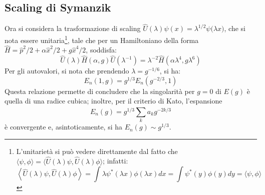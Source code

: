 \documentclass[10pt, a4paper]{scrartcl} %
\numberwithin{equation}{section}
\theoremstyle{style2}
\theoremstyle{style1}
\begin{document}
\subsection{Scaling di Symanzik}
Ora si considera la trasformazione di scaling $\hat{U}(\lambda ) \psi (x) = \lambda ^{1 / 2} \psi \big(\lambda x\big)$, che si nota essere unitaria\footnote{L'unitariet\`a si pu\`o vedere direttamente dal fatto che $\langle \psi ,\phi  \rangle= \langle \hat{U}(\lambda )\psi ,\hat{U}(\lambda ) \phi  \rangle$; infatti: 
\[
 \left\langle  \hat{U}(\lambda )\psi ,\hat{U}(\lambda ) \phi   \right\rangle =  \int \lambda \psi^* (\lambda x) \phi (\lambda x)  dx= \int \psi ^*(y) \phi (y) dy = \langle \psi ,\phi  \rangle
\] 
}, tale che per un Hamiltoniano della forma $\hat{H}= \hat{p}^2 / 2 + \alpha  \hat{x}^2 / 2 + g \hat{x}^4 / 2$, soddisfa:
\begin{equation}
	\hat{U}(\lambda ) \hat{H}(\alpha ,g) \hat{U}(\lambda ^{-1} ) = \lambda ^{-2}  \hat{H}(\alpha \lambda ^4, g \lambda ^6)
\end{equation}
Per gli autovalori, si nota che prendendo $\lambda = g ^{ -1/6} $, si ha:
\begin{equation}\label{wer}
	E_n(1,g) = g^{1 / 3} E_n(g^{-2 / 3} , 1)
\end{equation}
Questa relazione permette di concludere che la singolarit\`a per $g = 0$ di $E(g)$ \`e quella di una radice cubica; inoltre, per il criterio di Kato, l'espansione
\[
E_n(g) = g^{1 / 3} \sum_{k}^{} a_k g^{ - 2k / 3} 
\]
\`e convergente e, asintoticamente, si ha $E_n(g) \sim g^{ 1/3} $.
\end{document}
